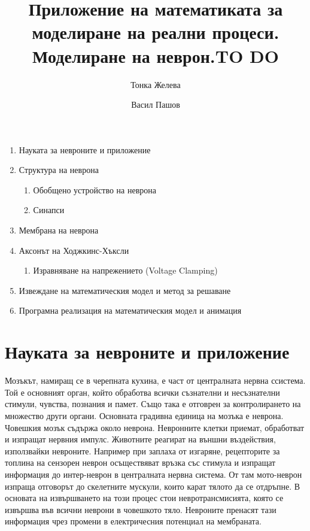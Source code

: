 \documentclass{article}
\title{Приложение на математиката за моделиране на реални процеси. Моделиране на неврон.}
\author{Тонка Желева \and Васил Пашов}
\begin{document}
\maketitle
\newpage

\tableofcontents
\newpage
\title{TO DO}
\begin{enumerate}
    \item Науката за невроните и приложение
    \item Структура на неврона
        \begin{enumerate}
            \item Обобщено устройство на неврона
            \item Синапси
        \end{enumerate}
    \item Мембрана на неврона
    \item Аксонът на Ходжкинс-Хъксли
        \begin{enumerate}
            \item Изравняване на напрежението (Voltage Clamping)
        \end{enumerate}
    \item Извеждане на математическия модел и метод за решаване
    \item Програмна реализация на математическия модел и анимация
\end{enumerate}

\section{Науката за невроните и приложение}

Мозъкът, намиращ се в черепната кухина, е част от централната нервна ссистема. Той е основният орган, който обработва всички съзнателни и
несъзнателни стимули, чувства,  познания и памет. Също така е отговрен за контролирането на множество други органи. Основната градивна
единица на мозъка е неврона. Човешкия мозък съдържа около   неврона. Невронните клетки приемат, обработват и изпращат нервния импулс.
Животните реагират на външни въздействия, използвайки невроните.  Например при заплаха от изгаряне, рецепторите за топлина на сензорен
неврон осъществяват връзка със стимула и изпращат информация до интер-неврон в централната нервна система. От там мото-неврон изпраща
отговорът до скелетните мускули, които карат тялото да се отдръпне. В основата на извършването на този процес стои невротрансмисията, която
се извършва във всични неврони в човешкото тяло. Невроните пренасят тази информация чрез промени в електричесния потенциал на мембраната.
\end{document}
